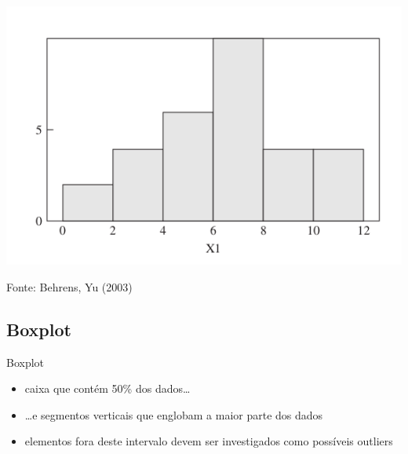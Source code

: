 \documentclass{beamer}
\begin{document}
\begin{frame}
  \begin{center}
    \includegraphics[height=0.7\textheight]{EDA/eda-histograma1}
  \end{center}
  Fonte: Behrens, Yu (2003)
\end{frame}


\subsection{Boxplot}

\begin{frame}{Boxplot}
  \begin{itemize}
  \item caixa que contém 50\% dos dados\ldots
  \item \ldots e segmentos verticais que englobam a maior parte dos
    dados
  \item elementos fora deste intervalo devem ser investigados como
    possíveis outliers
  \end{itemize}
\end{frame}
\end{document}
